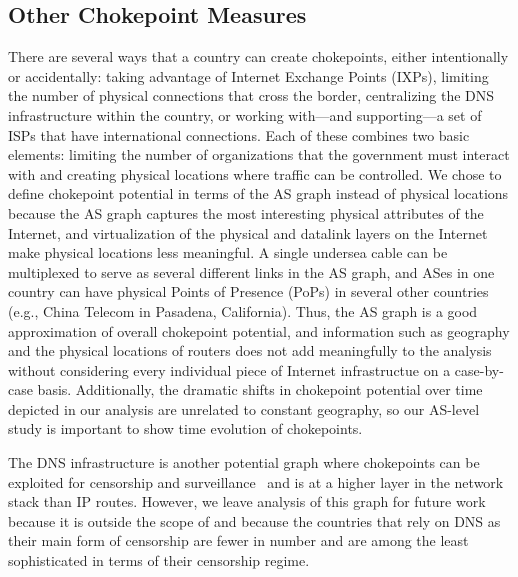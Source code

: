 \subsection{Other Chokepoint Measures}
There are several ways that a country can create chokepoints, either intentionally or accidentally: taking advantage of Internet Exchange Points (IXPs),
limiting the number of physical connections that cross the border, centralizing
the DNS infrastructure within the country, or working
with---and supporting---a set of ISPs that have international connections.
Each of these combines two basic elements: limiting the number of organizations that the government must interact with and creating physical locations where traffic can be controlled.
We chose to define chokepoint potential in terms of the AS graph instead of physical locations because the AS graph captures the most interesting physical attributes of the Internet, and
virtualization of the physical and datalink layers on the Internet make physical locations less meaningful. A single undersea cable can be multiplexed to serve as several different links in
the AS graph, and ASes in one country can have physical Points of Presence (PoPs) in several other countries (e.g., China Telecom in Pasadena, California). Thus, the AS graph is a good approximation
of overall chokepoint potential, and information such as geography and the physical locations of routers does not add meaningfully to the analysis without considering every individual piece of Internet
infrastructue on a case-by-case basis. Additionally, the dramatic shifts in chokepoint potential over time depicted in our analysis are unrelated to constant geography, so our AS-level study is important
to show time evolution of chokepoints.

The DNS infrastructure is another potential graph where chokepoints can be
exploited for censorship and surveillance~\cite{Greschbach2016a} and is at a
higher layer in the network stack than IP routes.  However, we leave analysis of
this graph for future work because it is outside the scope of \toolname{} and
because the countries that rely on DNS as their main form of censorship are
fewer in number and are among the least sophisticated in terms of their
censorship regime.

